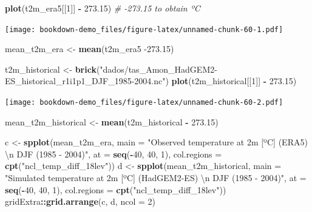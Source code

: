 \documentclass[]{book}
\newenvironment{Shaded}{\begin{snugshade}}{\end{snugshade}}
\newcommand{\CharTok}[1]{\textcolor[rgb]{0.31,0.60,0.02}{#1}}
\newcommand{\CommentTok}[1]{\textcolor[rgb]{0.56,0.35,0.01}{\textit{#1}}}
\newcommand{\DataTypeTok}[1]{\textcolor[rgb]{0.13,0.29,0.53}{#1}}
\newcommand{\DecValTok}[1]{\textcolor[rgb]{0.00,0.00,0.81}{#1}}
\newcommand{\FloatTok}[1]{\textcolor[rgb]{0.00,0.00,0.81}{#1}}
\newcommand{\KeywordTok}[1]{\textcolor[rgb]{0.13,0.29,0.53}{\textbf{#1}}}
\newcommand{\NormalTok}[1]{#1}
\newcommand{\OperatorTok}[1]{\textcolor[rgb]{0.81,0.36,0.00}{\textbf{#1}}}
\newcommand{\StringTok}[1]{\textcolor[rgb]{0.31,0.60,0.02}{#1}}
\begin{document}
\begin{Shaded}
\begin{Highlighting}[]
\KeywordTok{plot}\NormalTok{(t2m_era5[[}\DecValTok{1}\NormalTok{]] }\OperatorTok{-}\StringTok{ }\FloatTok{273.15}\NormalTok{)      }\CommentTok{# -273.15 to obtain ºC}
\end{Highlighting}
\end{Shaded}

\texttt{[image: bookdown-demo\_files/figure-latex/unnamed-chunk-60-1.pdf]}

\begin{Shaded}
\begin{Highlighting}[]
\NormalTok{mean_t2m_era <-}\StringTok{ }\KeywordTok{mean}\NormalTok{(t2m_era5 }\FloatTok{-273.15}\NormalTok{)}

\NormalTok{t2m_historical <-}\StringTok{ }\KeywordTok{brick}\NormalTok{(}\StringTok{"dados/tas_Amon_HadGEM2-ES_historical_r1i1p1_DJF_1985-2004.nc"}\NormalTok{)}
\KeywordTok{plot}\NormalTok{(t2m_historical[[}\DecValTok{1}\NormalTok{]] }\OperatorTok{-}\StringTok{ }\FloatTok{273.15}\NormalTok{)}
\end{Highlighting}
\end{Shaded}

\texttt{[image: bookdown-demo\_files/figure-latex/unnamed-chunk-60-2.pdf]}

\begin{Shaded}
\begin{Highlighting}[]
\NormalTok{mean_t2m_historical <-}\StringTok{ }\KeywordTok{mean}\NormalTok{(t2m_historical }\OperatorTok{-}\StringTok{ }\FloatTok{273.15}\NormalTok{)}

\NormalTok{c <-}\StringTok{ }\KeywordTok{spplot}\NormalTok{(mean_t2m_era,}
            \DataTypeTok{main =} \StringTok{"Observed temperature at 2m [ºC] (ERA5) }\CharTok{\textbackslash{}n}\StringTok{ DJF (1985 - 2004)"}\NormalTok{,}
            \DataTypeTok{at =} \KeywordTok{seq}\NormalTok{(}\OperatorTok{-}\DecValTok{40}\NormalTok{, }\DecValTok{40}\NormalTok{, }\DecValTok{1}\NormalTok{),}
            \DataTypeTok{col.regions =} \KeywordTok{cpt}\NormalTok{(}\StringTok{"ncl_temp_diff_18lev"}\NormalTok{))}
\NormalTok{d <-}\StringTok{ }\KeywordTok{spplot}\NormalTok{(mean_t2m_historical,}
            \DataTypeTok{main =} \StringTok{"Simulated temperature at 2m [ºC] (HadGEM2-ES) }\CharTok{\textbackslash{}n}\StringTok{ DJF (1985 - 2004)"}\NormalTok{,}
            \DataTypeTok{at =} \KeywordTok{seq}\NormalTok{(}\OperatorTok{-}\DecValTok{40}\NormalTok{, }\DecValTok{40}\NormalTok{, }\DecValTok{1}\NormalTok{),}
            \DataTypeTok{col.regions =} \KeywordTok{cpt}\NormalTok{(}\StringTok{"ncl_temp_diff_18lev"}\NormalTok{))}
\NormalTok{gridExtra}\OperatorTok{::}\KeywordTok{grid.arrange}\NormalTok{(c, d, }\DataTypeTok{ncol =} \DecValTok{2}\NormalTok{)}
\end{Highlighting}
\end{Shaded}
\end{document}

